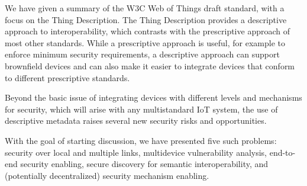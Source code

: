 We have given a summary of the W3C Web of Things draft
standard, with a focus on the Thing Description.
The Thing Description provides a descriptive approach to 
interoperability, which contrasts with the prescriptive
approach of most other standards.
While a prescriptive approach is useful, for example to
enforce minimum security requirements,
a descriptive approach can support brownfield devices
and can also make it easier to integrate devices that
conform to different prescriptive standards.

Beyond the basic issue of integrating devices
with different levels and mechanisms for security,
which will arise with any multistandard IoT system,
the use of descriptive metadata raises several
new security risks and opportunities.  

With the goal of starting discussion,
we have presented five such problems: 
security over local and multiple links,
multidevice vulnerability analysis,
end-to-end security enabling,
secure discovery for semantic interoperability,
and (potentially decentralized) security mechanism enabling.
